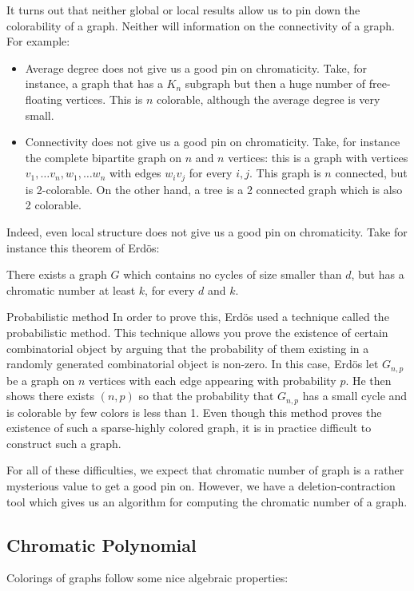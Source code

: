 It turns out that neither global or local results allow us to pin down the colorability of a graph. Neither will information on the connectivity of a graph. For example:
\begin{itemize}
 \item Average degree does not give us a good pin on chromaticity. Take, for instance, a graph that has a $K_n$ subgraph but then a huge number of free-floating vertices. This is $n$ colorable, although the average degree is very small. 
 \item Connectivity does not give us a good pin on chromaticity. Take, for instance the complete bipartite graph on $n$ and $n$ vertices: this is a graph with vertices $v_1, \ldots v_n, w_1, \ldots w_n$ with edges $w_iv_j$ for every $i, j$. This graph is $n$ connected, but is 2-colorable. On the other hand, a tree is a 2 connected graph which is also 2 colorable. 
\end{itemize}

Indeed, even local structure does not give us a good pin on chromaticity. Take for instance this theorem of Erd\"os:
\begin{theorem} \label{proj:probmethod}
 There exists a graph $G$ which contains no cycles of size smaller than $d$, but has a chromatic number at least $k$, for every $d$ and $k$. 
\end{theorem}
\begin{projectdescription}{Probabilistic method}
In order to prove this, Erd\"os used a technique called the probabilistic method. This technique allows you prove the existence of certain combinatorial object by arguing that the probability of them existing in a randomly generated combinatorial object is non-zero. In this case, Erd\"os 
let $G_{n,p}$ be a graph on $n$ vertices with each edge appearing with probability $p$. He then shows there exists $(n, p)$ so that the probability that $G_{n,p}$ has a small cycle and is colorable by few colors is less than 1. 
Even though this method proves the existence of such a sparse-highly colored graph, it is in practice difficult to construct such a graph. 
\end{projectdescription}

For all of these difficulties, we expect that chromatic number of graph is a rather mysterious value to get a good pin on. However, we have a deletion-contraction tool which gives us an algorithm for computing the chromatic number of a graph.  
\subsection{Chromatic Polynomial}
Colorings of graphs follow some nice algebraic properties:

